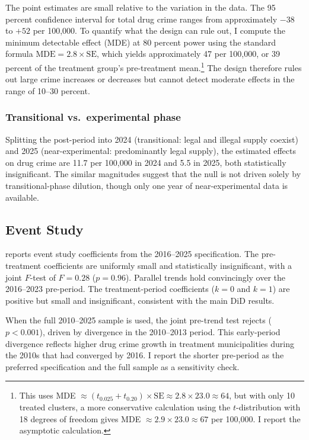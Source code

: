 \documentclass[12pt]{article}
\begin{document}
The point estimates are small relative to the variation in the data. The 95 percent confidence interval for total drug crime ranges from approximately $-38$ to $+52$ per 100,000. To quantify what the design can rule out, I compute the minimum detectable effect (MDE) at 80 percent power using the standard formula $\text{MDE} = 2.8 \times \text{SE}$, which yields approximately 47 per 100,000, or 39 percent of the treatment group's pre-treatment mean.\footnote{This uses MDE $\approx (t_{0.025} + t_{0.20}) \times \text{SE} \approx 2.8 \times 23.0 \approx 64$, but with only 10 treated clusters, a more conservative calculation using the $t$-distribution with 18 degrees of freedom gives MDE $\approx 2.9 \times 23.0 \approx 67$ per 100,000. I report the asymptotic calculation.} The design therefore rules out large crime increases or decreases but cannot detect moderate effects in the range of 10--30 percent.

\subsubsection*{Transitional vs.\ experimental phase} Splitting the post-period into 2024 (transitional: legal and illegal supply coexist) and 2025 (near-experimental: predominantly legal supply), the estimated effects on drug crime are 11.7 per 100,000 in 2024 and 5.5 in 2025, both statistically insignificant. The similar magnitudes suggest that the null is not driven solely by transitional-phase dilution, though only one year of near-experimental data is available.

\subsection{Event Study}



 reports event study coefficients from the 2016--2025 specification. The pre-treatment coefficients are uniformly small and statistically insignificant, with a joint $F$-test of $F = 0.28$ ($p = 0.96$). Parallel trends hold convincingly over the 2016--2023 pre-period. The treatment-period coefficients ($k = 0$ and $k = 1$) are positive but small and insignificant, consistent with the main DiD results.

When the full 2010--2025 sample is used, the joint pre-trend test rejects ($p < 0.001$), driven by divergence in the 2010--2013 period. This early-period divergence reflects higher drug crime growth in treatment municipalities during the 2010s that had converged by 2016. I report the shorter pre-period as the preferred specification and the full sample as a sensitivity check.
\end{document}
